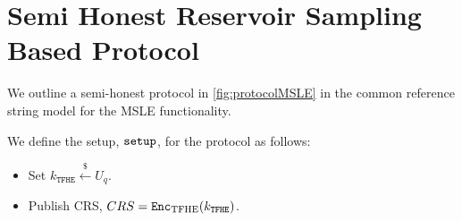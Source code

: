\section{Semi Honest Reservoir Sampling Based Protocol}
\label{sec:msle_protocol}
\newcommand{\partDecrySet}{\mathcal{P}}
We outline a semi-honest protocol in \cref{fig:protocolMSLE} in the common reference string model for the MSLE functionality.

We define the setup, $\texttt{setup}$, for the protocol as follows:
\begin{itemize}
	\item Set $k_{\texttt{TFHE}} \overset{\$}{\leftarrow} U_q.$
	\item Publish CRS, $CRS = \texttt{Enc}_{\mathrm{TFHE}}(k_{\texttt{TFHE}})$.
\end{itemize}



